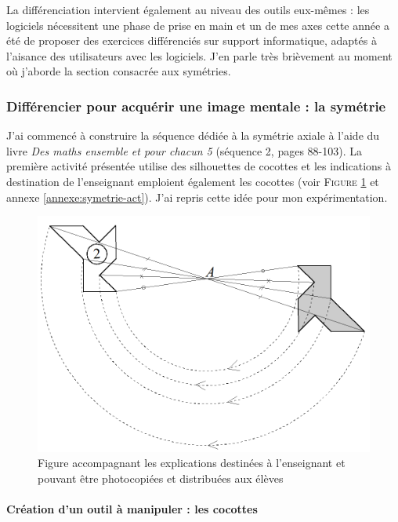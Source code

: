 La différenciation intervient également au niveau des outils eux-mêmes : les logiciels nécessitent une phase de prise en main et un de mes axes cette année a été de proposer des exercices différenciés sur support informatique, adaptés à l'aisance des utilisateurs avec les logiciels. J'en parle très brièvement au moment où j'aborde la section consacrée aux symétries.

\subsubsection{Différencier pour acquérir une image mentale : la symétrie}


J'ai commencé à construire la séquence dédiée à la symétrie axiale à l'aide du livre \textit{Des maths ensemble et pour chacun 5} \cite{mepcc} (séquence 2, pages 88-103). La première activité présentée utilise des silhouettes de cocottes et les indications à destination de l'enseignant emploient également les cocottes (voir \textsc{Figure \ref{fig:cocottes}} et annexe \ref{annexe:symetrie-act}). J'ai repris cette idée pour mon expérimentation.

\begin{figure}[h!]
    \centering
    \includegraphics[width=0.6\linewidth]{img/cocottesmepcc.png}
    \caption{Figure accompagnant les explications destinées à l'enseignant et pouvant être photocopiées et distribuées aux élèves}
    \label{fig:cocottes}
\end{figure}

\paragraph{Création d'un outil à manipuler : les cocottes}


